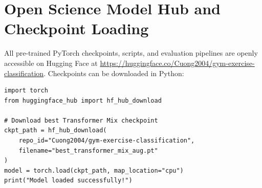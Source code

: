 \documentclass[preprint,12pt]{elsarticle}
\begin{document}
\section{Open Science Model Hub and Checkpoint Loading}
\label{app:open_science}

All pre-trained PyTorch \cite{paszke2019} checkpoints, scripts, and evaluation pipelines are openly accessible on Hugging Face at \url{https://huggingface.co/Cuong2004/gym-exercise-classification}. Checkpoints can be downloaded in Python:

\begin{verbatim}
import torch
from huggingface_hub import hf_hub_download

# Download best Transformer Mix checkpoint
ckpt_path = hf_hub_download(
    repo_id="Cuong2004/gym-exercise-classification",
    filename="best_transformer_mix_aug.pt"
)
model = torch.load(ckpt_path, map_location="cpu")
print("Model loaded successfully!")
\end{verbatim}
\end{document}
